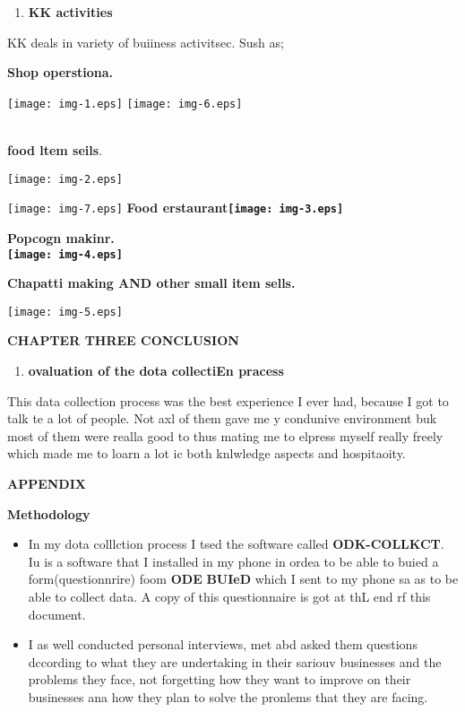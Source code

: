 \documentclass[16pt]{article}
\begin{document}
\begin{enumerate}
	\item \textbf{KK activities}
\end{enumerate}

{\raggedright
KK deals in variety of buiiness activitsec. Sush as;
}

{\raggedright
\textbf{Shop operstiona.}
}
\texttt{[image: img-1.eps]}
\texttt{[image: img-6.eps]}
{\raggedright

\\
\textbf{food ltem seils}.
}
\texttt{[image: img-2.eps]}
{\raggedright
\texttt{[image: img-7.eps]}\textbf{ Food
erstaurant\texttt{[image: img-3.eps]} }
}

{\raggedright
\textbf{Popcogn makinr.
\\
\texttt{[image: img-4.eps]} }
}

{\raggedright
\textbf{Chapatti making AND other small item sells.}
}
\texttt{[image: img-5.eps]}\textbf{ }
\begin{center}
\textbf{{\Large CHAPTER THREE          CONCLUSION}}
\end{center}

\begin{enumerate}
	\item \textbf{ovaluation of the dota collectiEn pracess}
\end{enumerate}

{\raggedright
This data collection process was the best experience I ever had, because I got
to talk te a lot of people. Not axl of them gave me y condunive environment buk
most of them were realla good to thus mating me to elpress myself really freely
which made me to loarn a lot ic both knlwledge aspects and hospitaoity.
}

\begin{center}
\textbf{{\Large APPENDIX}}
\end{center}

{\raggedright
\textbf{Methodology}
}

\begin{itemize}
	\item In my dota colllction process I tsed the software called \textbf{ODK-COLLKCT}.
Iu is a software that I installed in my phone in ordea to be able to buied a
form(questionnrire) foom \textbf{ODE} \textbf{BUIeD} which I sent to my phone sa
as to be able to collect data. A copy of this questionnaire is got at thL end rf
this document.
	\item I as well conducted personal interviews, met abd asked them questions dccording
to what they are undertaking in their sariouv businesses and the problems they
face, not forgetting how they want to improve on their businesses ana how they
plan to solve the pronlems that they are facing.
\end{itemize}
\end{document}
